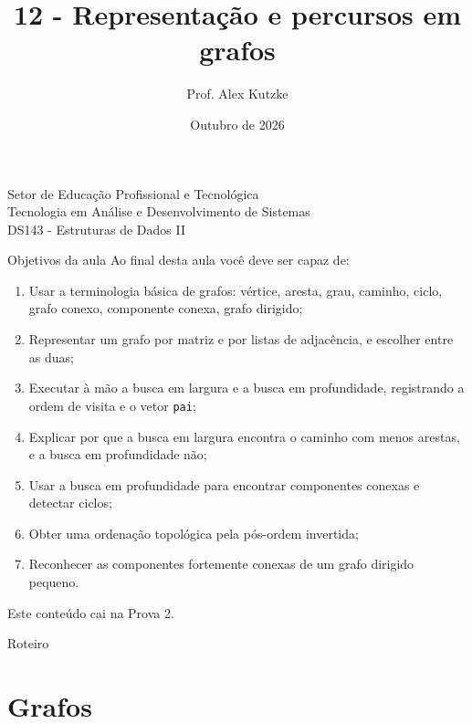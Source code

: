 \documentclass{beamer}
\title{12 - Representação e percursos em grafos}
\author{Prof. Alex Kutzke}
\date{Outubro de 2026}
\begin{document}
\begin{frame}
	\begin{center}
		\large{Setor de Educação Profissional e Tecnológica}\\
		Tecnologia em Análise e Desenvolvimento de Sistemas\\
		\vspace{1cm}
		\small{DS143 - Estruturas de Dados II}
	\end{center}
	\titlepage
\end{frame}

\begin{frame}{Objetivos da aula}
	\footnotesize
	Ao final desta aula você deve ser capaz de:
	\begin{enumerate}
		\itemsep=0pt
		\item Usar a terminologia básica de grafos: vértice, aresta, grau,
		      caminho, ciclo, grafo conexo, componente conexa, grafo dirigido;
		\item Representar um grafo por matriz e por listas de adjacência, e
		      escolher entre as duas;
		\item Executar à mão a busca em largura e a busca em profundidade,
		      registrando a ordem de visita e o vetor \texttt{pai};
		\item Explicar por que a busca em largura encontra o caminho com menos
		      arestas, e a busca em profundidade não;
		\item Usar a busca em profundidade para encontrar componentes conexas e
		      detectar ciclos;
		\item Obter uma ordenação topológica pela pós-ordem invertida;
		\item Reconhecer as componentes fortemente conexas de um grafo dirigido
		      pequeno.
	\end{enumerate}
	\vspace{0.1cm}
	Este conteúdo cai na Prova 2.
\end{frame}

\begin{frame}{Roteiro}
	\tableofcontents
\end{frame}

\section{Grafos}
\end{document}
